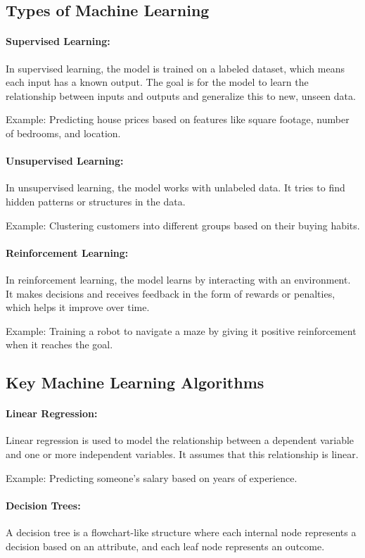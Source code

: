 \subsection{Types of Machine Learning}
\paragraph{Supervised Learning:} In supervised learning, the model is trained on a labeled dataset, which means each input has a known output. The goal is for the model to learn the relationship between inputs and outputs and generalize this to new, unseen data.

Example: Predicting house prices based on features like square footage, number of bedrooms, and location.

\paragraph{Unsupervised Learning:} In unsupervised learning, the model works with unlabeled data. It tries to find hidden patterns or structures in the data.

Example: Clustering customers into different groups based on their buying habits.

\paragraph{Reinforcement Learning:} In reinforcement learning, the model learns by interacting with an environment. It makes decisions and receives feedback in the form of rewards or penalties, which helps it improve over time.

Example: Training a robot to navigate a maze by giving it positive reinforcement when it reaches the goal.

\subsection{Key Machine Learning Algorithms}
\paragraph{Linear Regression:} Linear regression is used to model the relationship between a dependent variable and one or more independent variables. It assumes that this relationship is linear.

Example: Predicting someone’s salary based on years of experience.

\paragraph{Decision Trees:} A decision tree is a flowchart-like structure where each internal node represents a decision based on an attribute, and each leaf node represents an outcome.


